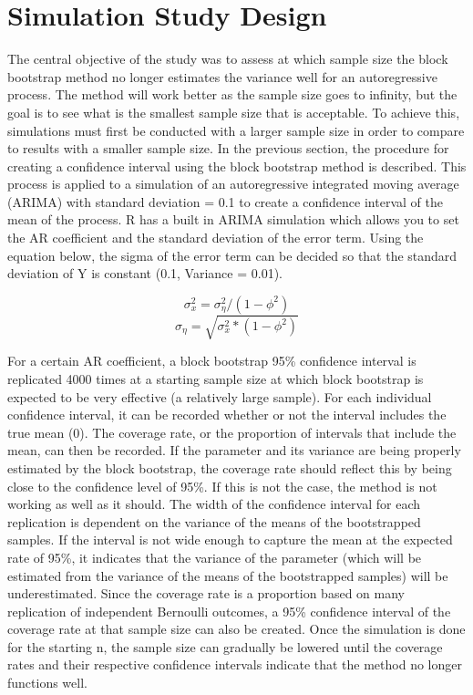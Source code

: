 \documentclass[12pt, letterpaper, titlepage]{article}
\begin{document}
\section{Simulation Study Design}
\label{sec:simdesign}

The central objective of the study was to assess at which sample size the block bootstrap method no longer estimates the variance well for an autoregressive process. The method will work better as the sample size goes to infinity, but the goal is to see what is the smallest sample size that is acceptable. To achieve this, simulations must first be conducted with a larger sample size in order to compare to results with a smaller sample size. In the previous section, the procedure for creating a confidence interval using the block bootstrap method is described. This process is applied to a simulation of an autoregressive integrated moving average (ARIMA) with standard deviation = 0.1 to create a confidence interval of the mean of the process. R has a built in ARIMA simulation which allows you to set the AR coefficient and the standard deviation of the error term. Using the equation below, the sigma of the error term can be decided so that the standard deviation of Y is constant (0.1, Variance = 0.01). 

\[ \sigma_{x}^{2}=\sigma_{\eta}^{2}/\left( 1-\phi^2 \right)\]
\[\sigma_{\eta}=\sqrt{\sigma_{x}^{2}*\left( 1-\phi^2 \right)}\]

For a certain AR coefficient, a block bootstrap 95\% confidence interval is replicated 4000 times at a starting sample size at which block bootstrap is expected to be very effective (a relatively large sample). For each individual confidence interval, it can be recorded whether or not the interval includes the true mean (0). The coverage rate, or the proportion of intervals that include the mean, can then be recorded. If the parameter and its variance are being properly estimated by the block bootstrap, the coverage rate should reflect this by being close to the confidence level of 95\%. If this is not the case, the method is not working as well as it should. The width of the confidence interval for each replication is dependent on the variance of the means of the bootstrapped samples. If the interval is not wide enough to capture the mean at the expected rate of 95\%, it indicates that the variance of the parameter (which will be estimated from the variance of the means of the bootstrapped samples) will be underestimated. Since the coverage rate is a proportion based on many replication of independent Bernoulli outcomes, a 95\% confidence interval of the coverage rate at that sample size can also be created. Once the simulation is done for the starting n, the sample size can gradually be lowered until the coverage rates and their respective confidence intervals indicate that the method no longer functions well.
\end{document}
